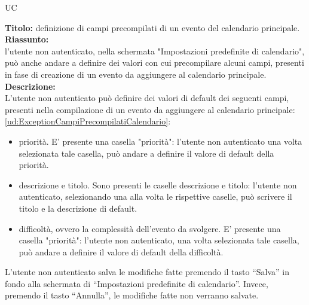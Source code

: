 \begin{listaPersonale}{UC}
\begin{listaPersonale2}[UC] {}
            \newpage
            \textbf{Titolo: } definizione di campi precompilati di un evento del calendario principale. \\
            \textbf{Riassunto: } \\ l'utente non autenticato, nella schermata "Impostazioni predefinite di calendario", può anche andare a definire dei valori con cui precompilare alcuni campi, presenti in fase di creazione di un evento da aggiungere al calendario principale. \\
            \textbf{Descrizione: } \\
            L'utente non autenticato può definire dei valori di default dei seguenti campi, presenti nella compilazione di un evento da aggiungere al calendario principale: \ref{ud:ExceptionCampiPrecompilatiCalendario}:
            \begin{itemize}
                \item priorità. E' presente una casella "priorità": l'utente non autenticato una volta selezionata tale casella, può andare a definire il valore di default della priorità.
                \item descrizione e titolo. Sono presenti le caselle descrizione e titolo: l'utente non autenticato, selezionando una alla volta le rispettive caselle, può scrivere il titolo e la descrizione di default.
                \item difficoltà, ovvero la complessità dell'evento da svolgere. E' presente una casella "priorità": l'utente non autenticato, una volta selezionata tale casella, può andare a definire il valore di default della difficoltà.
            \end{itemize}
            L'utente non autenticato salva le modifiche fatte premendo il tasto “Salva” in fondo alla schermata di “Impostazioni predefinite di calendario”. Invece, premendo il tasto “Annulla”, le modifiche fatte non verranno salvate.


\end{listaPersonale2}
\end{listaPersonale}
